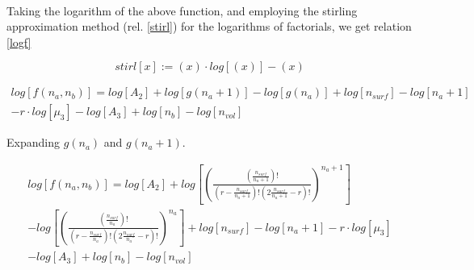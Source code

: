 \documentclass[10pt,letterpaper]{article}
\newcommand{\stirl}[1]{
    \ensuremath{
        \left(
            #1
        \right)
        \cdotp 
        log
        \left[
            \left(
            #1
            \right)
        \right]
        -
        \left(
            #1
        \right)
    }
}
\newcommand{\gOFm}[2]{
\left( \frac{
\left(\frac{#2}{#1}\right)!}{ 
\left(r-\frac{#2}{#1}\right)! 
\left(2\frac{#2}{#1}-r\right)!}
\right)^{#1}  
}
\begin{document}


\text{}\\
\noindent Taking the logarithm of the above function, and employing the stirling approximation method (rel. \ref{stirl}) for the logarithms of factorials, we get relation \ref{logf}

\begin{equation}
	\boxed{stirl[x]:=\stirl{x}}
	\label{stirl}
\end{equation}


\begin{multline}
	log
	\left[
	f(n_a,n_b)
	\right]
	=
	log
		\left[
		A_2
		\right]
		+
		log\left[
            g(n_a+1)
        \right]
        -
        log\left[
            g(n_a)
        \right]
		+
		log
		\left[
		n_{surf}
		\right]
		-
		log
		\left[
		n_a+1
		\right]\\
		-
		r
		\cdot
		log
		\left[
		\mu_{3}
		\right]
		-
		log
		\left[
		A_3
		\right]
		+
		log
		\left[
		n_{b}
		\right]
		-
		log
		\left[
		n_{vol}	
	\right]
		\label{logf}
\end{multline}

\noindent Expanding $g(n_a)$ and $g(n_a +1)$.

\begin{multline}
	log
	\left[
	f(n_a,n_b)
	\right]
	=
	log
		\left[
		A_2
		\right]
		+
		log\left[
            \gOFm{n_a+1}{n_{surf}}
        \right]\\
        -
        log\left[
            \gOFm{n_a}{n_{surf}}
        \right]
		+
		log
		\left[
		n_{surf}
		\right]
		-
		log
		\left[
		n_a+1
		\right]
		-
		r
		\cdot
		log
		\left[
		\mu_{3}
		\right]\\
		-
		log
		\left[
		A_3
		\right]
		+
		log
		\left[
		n_{b}
		\right]
		-
		log
		\left[
		n_{vol}	
	\right]
		\label{logfexpnd1}
\end{multline}
\end{document}
